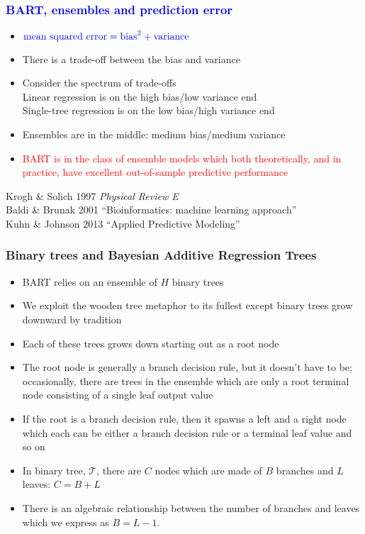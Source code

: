 \documentclass[11pt,dvipsnames,usenames,times]{beamer}
\begin{document}
\begin{frame}
\frametitle{\bf\textcolor{blue}{BART, ensembles and prediction error}}
\boldmath

\begin{itemize}
\item $\textcolor{blue}{\mbox{mean squared error}= \mbox{bias}^2 + \mbox{variance}}$
\vspace*{0.1in}
\item There is a trade-off between the bias and variance
\vspace*{0.1in}
\item Consider the spectrum of trade-offs\\
\vspace*{0.1in}
Linear regression is on the high bias/low variance end\\
\vspace*{0.1in}
Single-tree regression is on the low bias/high variance end\\
\vspace*{0.1in}
\item Ensembles are in the middle:
medium bias/medium variance
\vspace*{0.1in}
\item \textcolor{red}{BART is in the class of ensemble models which
    both theoretically, and in practice, have excellent
out-of-sample predictive performance}
\end{itemize}

Krogh \& Solich 1997 {\it Physical Review E}\\
Baldi \& Brunak 2001 ``Bioinformatics: machine learning approach''\\
Kuhn \& Johnson 2013 ``Applied Predictive Modeling''
\end{frame}

\begin{frame}[fragile]
\frametitle{Binary trees and Bayesian Additive Regression Trees}

\begin{itemize}
\item 
BART relies on an ensemble of $H$ binary trees 
\item We exploit the wooden tree metaphor to its
fullest except binary trees grow downward by tradition
\item Each of these trees grows down starting out as
a root node
\item The root node is generally a branch decision rule, but
it doesn't have to be; occasionally, there are trees in the ensemble
which are only a root terminal node consisting of a single leaf output
value
\item If the root is a branch decision rule, then it spawns a left
and a right node which each can be either a branch decision rule or a
terminal leaf value and so on
\item In binary tree, $\mathcal{T}$, there
are $C$ nodes which are made of $B$ branches and $L$ leaves: $C=B+L$
\item 
There is an algebraic relationship between the number of branches and
leaves which we express as $B= L-1$.
\end{itemize}
\end{frame}
\end{document}
